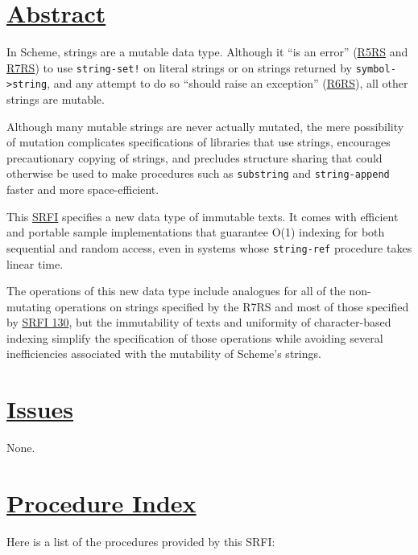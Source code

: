 \section{\texorpdfstring{\href{}{Abstract}}{Abstract}}\label{abstract}

In Scheme, strings are a mutable data type. Although it ``is an error''
(\protect\hyperlink{R5RS}{R5RS} and \protect\hyperlink{R7RS}{R7RS}) to
use \texttt{string-set!} on literal strings or on strings returned by
\texttt{symbol-\textgreater{}string}, and any attempt to do so ``should
raise an exception'' (\protect\hyperlink{R6RS}{R6RS}), all other strings
are mutable.

Although many mutable strings are never actually mutated, the mere
possibility of mutation complicates specifications of libraries that use
strings, encourages precautionary copying of strings, and precludes
structure sharing that could otherwise be used to make procedures such
as \texttt{substring} and \texttt{string-append} faster and more
space-efficient.

This \protect\hyperlink{SRFI}{SRFI} specifies a new data type of
immutable texts. It comes with efficient and portable sample
implementations that guarantee O(1) indexing for both sequential and
random access, even in systems whose \texttt{string-ref} procedure takes
linear time.

The operations of this new data type include analogues for all of the
non-mutating operations on strings specified by the R7RS and most of
those specified by \protect\hyperlink{SRFI-130}{SRFI 130}, but the
immutability of texts and uniformity of character-based indexing
simplify the specification of those operations while avoiding several
inefficiencies associated with the mutability of Scheme's strings.

\section{\texorpdfstring{\href{}{Issues}}{Issues}}\label{issues}

None.

\section{\texorpdfstring{\href{}{Procedure
Index}}{Procedure Index}}\label{procedure-index}

Here is a list of the procedures provided by this SRFI:

